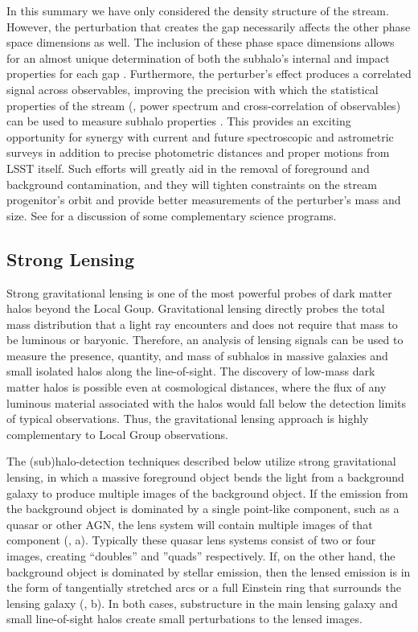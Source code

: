 In this summary we have only considered the density structure of the stream. However, the perturbation that creates the gap necessarily affects the other phase space dimensions as well. The inclusion of these phase space dimensions allows for an almost unique determination of both the subhalo's internal and impact properties for each gap \citep{erkal2015b}. Furthermore, the perturber's effect produces a correlated signal across observables, improving the precision with which the statistical properties of the stream (\eg, power spectrum and cross-correlation of observables) can be used to measure subhalo properties \citep{bovy:2017}. This provides an exciting opportunity for synergy with current and future spectroscopic and astrometric surveys in addition to precise photometric distances and proper motions from LSST itself. Such efforts will greatly aid in the removal of foreground and background contamination, and they will tighten constraints on the stream progenitor's orbit and provide better measurements of the perturber's mass and size. See  for a discussion of some complementary science programs.

\subsection{Strong Lensing  }
\label{sec:stronglens} 

Strong gravitational lensing is one of the most powerful probes of dark matter halos beyond the Local Goup. 
Gravitational lensing directly probes the total mass distribution that a light ray encounters and does not require that mass to be luminous or baryonic.
Therefore, an analysis of lensing signals can be used to measure the presence, quantity, and mass of subhalos in massive galaxies and small isolated halos along the line-of-sight.  
The discovery of low-mass dark matter halos is possible even at cosmological distances, where the flux of any luminous material associated with the halos would fall below the detection limits of typical observations.  
Thus, the gravitational lensing approach is highly complementary to Local Group observations.

The (sub)halo-detection techniques described below utilize strong gravitational lensing, in which a massive foreground object bends the light from a background galaxy to produce multiple images of the background object.  
If the emission from the background object is dominated by a single point-like component, such as a quasar or other AGN, the lens system will contain multiple images of that component (\eg, a).
Typically these quasar lens systems consist of two or four images, creating ``doubles'' and ''quads'' respectively. 
If, on the other hand, the background object is dominated by stellar emission, then the lensed emission is in the form of tangentially stretched arcs or a full Einstein ring that surrounds the lensing galaxy (\eg, b).  
In both cases, substructure in the main lensing galaxy and small line-of-sight halos create small perturbations to the lensed images.


